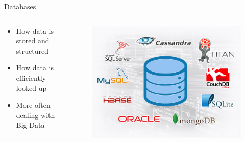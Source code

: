 \documentclass{beamer}
\begin{document}
\begin{frame}{Databases}
	\begin{columns}
		\begin{column}{.45\textwidth}
			\begin{itemize}
				\item How data is stored and structured
				\item How data is efficiently looked up
				\item More often dealing with Big Data
			\end{itemize}
		\end{column}
		\begin{column}{.55\textwidth}
			\begin{figure}
				\includegraphics[width=\linewidth]{img/db.jpg}
			\end{figure}
		\end{column}
	\end{columns}
\end{frame}
\end{document}
